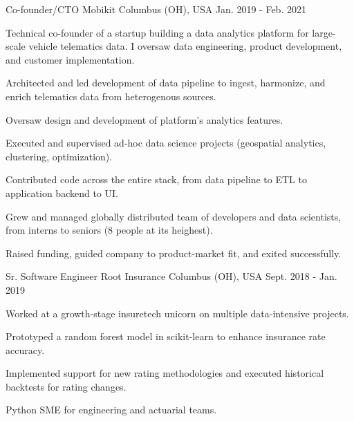 \begin{cventries}
  \cventry
    {Co-founder/CTO} %
    {Mobikit} %
    {Columbus (OH), USA} %
    {Jan. 2019 - Feb. 2021} %
    {
      Technical co-founder of a startup building a data analytics platform for large-scale vehicle telematics data. I oversaw data engineering, product development, and customer implementation.
      \vspace{5.0mm}
      \begin{cvitems} %
        \item {Architected and led development of data pipeline to ingest, harmonize, and enrich telematics data from heterogenous sources.}
        \item {Oversaw design and development of platform's analytics features.}
        \item {Executed and supervised ad-hoc data science projects (geospatial analytics, clustering, optimization).}
        \item {Contributed code across the entire stack, from data pipeline to ETL to application backend to UI.}
        \item {Grew and managed globally distributed team of developers and data scientists, from interns to seniors (8 people at its heighest).}
        \item {Raised funding, guided company to product-market fit, and exited successfully.}
      \end{cvitems}
    }

  \cventry
    {Sr. Software Engineer} %
    {Root Insurance} %
    {Columbus (OH), USA} %
    {Sept. 2018 - Jan. 2019} %
    {
      Worked at a growth-stage insuretech unicorn on multiple data-intensive projects.
      \vspace{5.0mm}
      \begin{cvitems} %
        \item {Prototyped a random forest model in scikit-learn to enhance insurance rate accuracy.}
        \item {Implemented support for new rating methodologies and executed historical backtests for rating changes.}
        \item {Python SME for engineering and actuarial teams.}
      \end{cvitems}
    }


\end{cventries}
